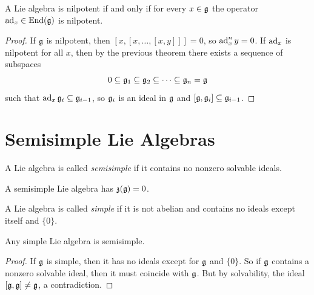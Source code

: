 \begin{theorem}
  A Lie algebra is nilpotent if and only
  if for every $x \in \mathfrak{g}$ the operator
  $\operatorname{ad}_x \in \operatorname{End}(\mathfrak{g})$ is nilpotent.
\end{theorem}

\begin{proof}
  If $\mathfrak{g}$ is nilpotent, then
  $[x, [x, \dots, [x, y]]] = 0$, so
  $\operatorname{ad}^n_x y = 0$.
  If $\operatorname{ad}_x$ is nilpotent for all $x$, then
  by the previous theorem there exists
  a sequence of subspaces
  \[
    0 \subseteq \mathfrak{g}_1 \subseteq \mathfrak{g}_2 \subseteq \dots \subseteq \mathfrak{g}_n = \mathfrak{g}
  \]
  such that $\operatorname{ad}_x \mathfrak{g}_i \subseteq \mathfrak{g}_{i - 1}$,
  so $\mathfrak{g}_i$ is an ideal in $\mathfrak{g}$ and
  $[\mathfrak{g}, \mathfrak{g}_i] \subseteq \mathfrak{g}_{i - 1}$.
\end{proof}

\section{Semisimple Lie Algebras}

\begin{definition}
  A Lie algebra is called \emph{semisimple}
  if it contains no nonzero solvable ideals.
\end{definition}

\begin{remark}
  A semisimple Lie algebra has
  $\mathfrak{z}(\mathfrak{g}) = 0$.
\end{remark}

\begin{definition}
  A Lie algebra is called \emph{simple}
  if it is not abelian and contains
  no ideals except itself and $\{0\}$.
\end{definition}

\begin{lemma}
  Any simple Lie algebra is semisimple.
\end{lemma}

\begin{proof}
  If $\mathfrak{g}$ is simple, then it has no
  ideals except for $\mathfrak{g}$ and $\{0\}$.
  So if $\mathfrak{g}$ contains a nonzero solvable
  ideal, then it must coincide with
  $\mathfrak{g}$. But by solvability,
  the ideal $[\mathfrak{g}, \mathfrak{g}] \ne \mathfrak{g}$, a
  contradiction.
\end{proof}

